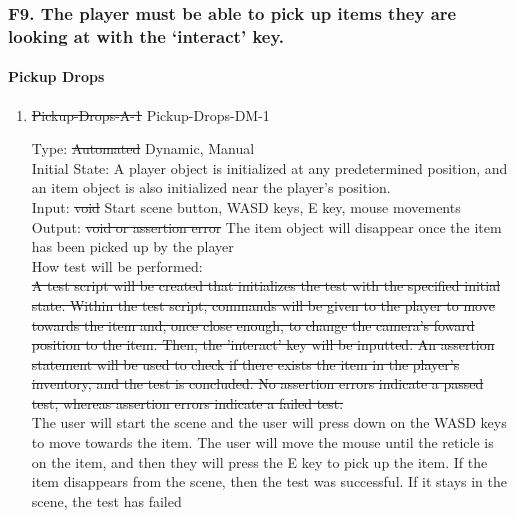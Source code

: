 \documentclass[12pt, titlepage]{article}
\newcounter{ftnum}
\begin{document}
\subsubsection{{\color{magenta} F9.} The player must be able to pick up items they are looking at with the ‘interact’ key.} 

\paragraph{Pickup Drops}

\begin{enumerate}

\item{\sout{Pickup-Drops-A-1} {\color{magenta} Pickup-Drops-DM-1} \\}  \label{F9-1}

Type: \sout{Automated} {\color{magenta} Dynamic, Manual}\\
					
Initial State: A player object is initialized at any predetermined position, and an item object is also initialized near the player's position.\\
					
Input: \sout{void} {\color{magenta} Start scene button, WASD keys, E key, mouse movements}   \\
					
Output: \sout{void or assertion error} {\color{magenta} The item object will disappear once the item has been picked up by the player} \\
					
How test will be performed:\\ \sout{A test script will be created that initializes the test with the specified initial state. Within the test script, commands will be given to the player to move towards the item and, once close enough, to change the camera's foward position to the item. Then, the 'interact' key will be inputted. An assertion statement will be used to check if there exists the item in the player's inventory, and the test is concluded. No assertion errors indicate a passed test, whereas assertion errors indicate a failed test.}\\
{\color{magenta} The user will start the scene and the user will press down on the WASD keys to move towards the item. The user will move the mouse until the reticle is on the item, and then they will press the E key to pick up the item. If the item disappears from the scene, then the test was successful. If it stays in the scene, the test has failed}\\

\end{enumerate}
\end{document}

